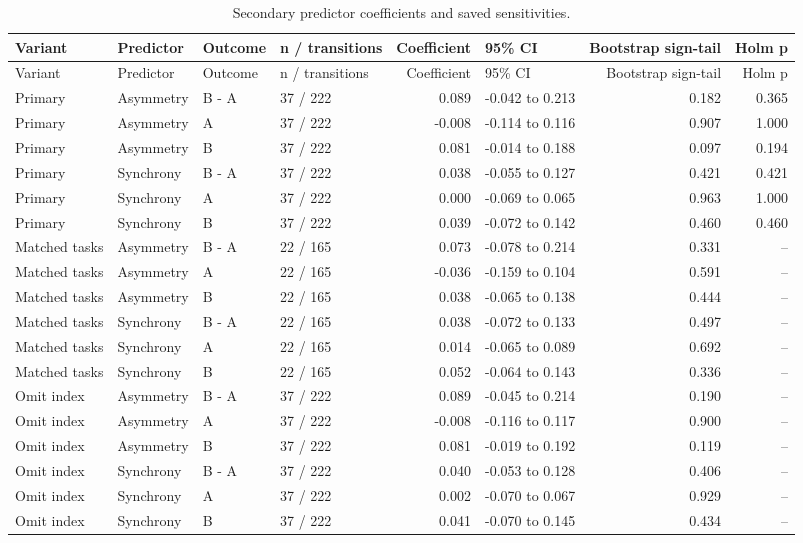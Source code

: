 \begingroup
\footnotesize
\renewcommand{\arraystretch}{1.12}
\setlength{\tabcolsep}{3pt}
\begin{longtable}{p{2.3cm}p{2.0cm}l l r p{2.6cm} r r}
\caption{Secondary predictor coefficients and saved sensitivities.}\label{tab:S3}\\
\toprule
Variant & Predictor & Outcome & n / transitions & Coefficient & 95\% CI & Bootstrap sign-tail & Holm p \\
\midrule\endfirsthead
\toprule
Variant & Predictor & Outcome & n / transitions & Coefficient & 95\% CI & Bootstrap sign-tail & Holm p \\
\midrule\endhead
Primary & Asymmetry & B - A & 37 / 222 & 0.089 & -0.042 to 0.213 & 0.182 & 0.365 \\
Primary & Asymmetry & A & 37 / 222 & -0.008 & -0.114 to 0.116 & 0.907 & 1.000 \\
Primary & Asymmetry & B & 37 / 222 & 0.081 & -0.014 to 0.188 & 0.097 & 0.194 \\
Primary & Synchrony & B - A & 37 / 222 & 0.038 & -0.055 to 0.127 & 0.421 & 0.421 \\
Primary & Synchrony & A & 37 / 222 & 0.000 & -0.069 to 0.065 & 0.963 & 1.000 \\
Primary & Synchrony & B & 37 / 222 & 0.039 & -0.072 to 0.142 & 0.460 & 0.460 \\
Matched tasks & Asymmetry & B - A & 22 / 165 & 0.073 & -0.078 to 0.214 & 0.331 & -- \\
Matched tasks & Asymmetry & A & 22 / 165 & -0.036 & -0.159 to 0.104 & 0.591 & -- \\
Matched tasks & Asymmetry & B & 22 / 165 & 0.038 & -0.065 to 0.138 & 0.444 & -- \\
Matched tasks & Synchrony & B - A & 22 / 165 & 0.038 & -0.072 to 0.133 & 0.497 & -- \\
Matched tasks & Synchrony & A & 22 / 165 & 0.014 & -0.065 to 0.089 & 0.692 & -- \\
Matched tasks & Synchrony & B & 22 / 165 & 0.052 & -0.064 to 0.143 & 0.336 & -- \\
Omit index & Asymmetry & B - A & 37 / 222 & 0.089 & -0.045 to 0.214 & 0.190 & -- \\
Omit index & Asymmetry & A & 37 / 222 & -0.008 & -0.116 to 0.117 & 0.900 & -- \\
Omit index & Asymmetry & B & 37 / 222 & 0.081 & -0.019 to 0.192 & 0.119 & -- \\
Omit index & Synchrony & B - A & 37 / 222 & 0.040 & -0.053 to 0.128 & 0.406 & -- \\
Omit index & Synchrony & A & 37 / 222 & 0.002 & -0.070 to 0.067 & 0.929 & -- \\
Omit index & Synchrony & B & 37 / 222 & 0.041 & -0.070 to 0.145 & 0.434 & -- \\
\bottomrule
\end{longtable}
